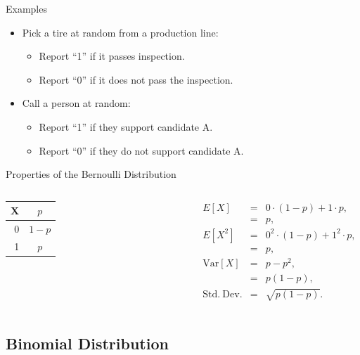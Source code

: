\begin{frame}{Examples}

  \begin{itemize}
  \item Pick a tire at random from a production line:
    \begin{itemize}
      \item Report ``1'' if it passes inspection. 
      \item Report ``0'' if it does not pass the inspection.
    \end{itemize}
  \item Call a person at random: 
    \begin{itemize}
    \item Report ``1'' if they support candidate A. \\
    \item Report ``0'' if they do not support candidate A.
    \end{itemize}
  \end{itemize}
  
\end{frame}

\begin{frame}{Properties of the Bernoulli Distribution}

  \begin{columns}
    \begin{tabular}{r|c}
      X & $p$ \\ \hline
      0 & $1-p$ \\
      1 & $p$
    \end{tabular}

    \begin{eqnarray*}
      E[X] & = & 0\cdot (1-p) + 1\cdot p, \\
      & = & p, \\
      E[X^2] & = & 0^2\cdot (1-p) + 1^2\cdot p, \\
      & = & p, \\
      \mathrm{Var}[X] & = & p - p^2, \\
      & = & p(1-p), \\
      \mathrm{Std.~Dev.} & = & \sqrt{p(1-p)}.
    \end{eqnarray*}
  \end{columns}
\end{frame}

\subsection{Binomial Distribution}

